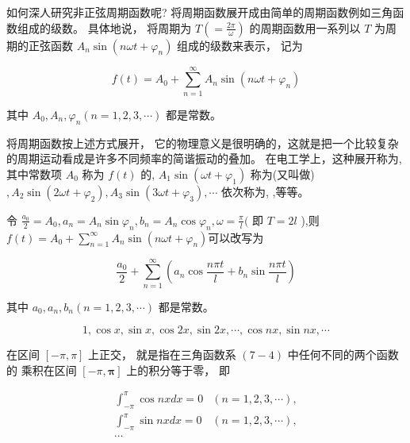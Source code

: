 如何深人研究非正弦周期函数呢? 将周期函数展开成由简单的周期函数例如三角函数组成的级数。 具体地说， 将周期为 $ T\left(=\frac{2 \pi}{\omega}\right) $ 的周期函数用一系列以 $ T $ 为周 期的正弦函数 $ A_{n} \sin \left(n \omega t+\varphi_{n}\right) $ 组成的级数来表示， 记为

\begin{equation} f(t)=A_{0}+\sum_{n=1}^{\infty} A_{n} \sin \left(n \omega t+\varphi_{n}\right) \end{equation}

其中 $ A_{0}, A_{n}, \varphi_{n}(n=1,2,3, \cdots) $ 都是常数。

将周期函数按上述方式展开， 它的物理意义是很明确的，这就是把一个比较复杂的周期运动看成是许多不同频率的简谐振动的叠加。 在电工学上，这种展开称为,其中常数项 $ A_{0} $ 称为 $ f(t) $ 的, $ A_{1} \sin \left(\omega t+\varphi_{1}\right) $ 称为(又叫做) $ , A_{2} \sin \left(2 \omega t+\varphi_{2}\right), A_{3} \sin \left(3 \omega t+\varphi_{3}\right), \cdots $ 依次称为, ,等等。

\begin{definition}[三角级数]
    令 $ \frac{a_{0}}{2}=A_{0}, a_{n}=A_{n} \sin \varphi_{n}, b_{n}=A_{n} \cos \varphi_{n}, \omega=\frac{\pi}{l}( $ 即 $ T=2 l $ ),则$ f(t)=A_{0}+\sum_{n=1}^{\infty} A_{n} \sin \left(n \omega t+\varphi_{n}\right) $可以改写为

    \begin{equation} \frac{a_{0}}{2}+\sum_{n=1}^{\infty}\left(a_{n} \cos \frac{n \pi t}{l}+b_{n} \sin \frac{n \pi t}{l}\right) \end{equation}

    其中 $ a_{0}, a_{n}, b_{n}(n=1,2,3, \cdots) $ 都是常数。 
\end{definition}

\begin{definition}[三角函数系（基波）]
    \begin{equation} 1, \cos x, \sin x, \cos 2 x, \sin 2 x, \cdots, \cos n x, \sin n x, \cdots \end{equation}

    在区间 $ [-\pi, \pi] $ 上正交， 就是指在三角函数系 $ (7-4) $ 中任何不同的两个函数的 乘积在区间 $ [-\pi, \boldsymbol{\pi}] $ 上的积分等于零， 即

    \begin{equation} \begin{array}{ll}\int_{-\pi}^{\pi} \cos n x {d} x=0 & (n=1,2,3, \cdots), \\ \int_{-\pi}^{\pi} \sin n x {d} x=0 & (n=1,2,3, \cdots),\\ \cdots
    \end{array} \end{equation}
\end{definition}

